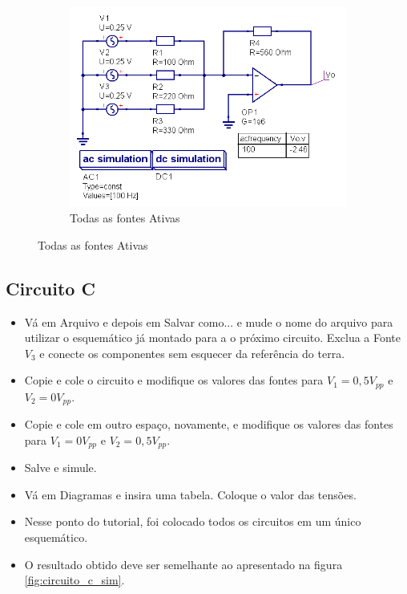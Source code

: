 \begin{figure}[H]
\begin{subfigure}{.45\textwidth}
        \includegraphics[width=\textwidth]{imagens/CircuitoB/-2_46.png}
        \caption{Todas as fontes Ativas}
        \label{fig:0_fon_des}
     \end{subfigure}
\end{figure}



\subsection{Circuito C}


    \begin{itemize}
        \item Vá em Arquivo e depois em Salvar como... e mude o nome do arquivo para utilizar o esquemático já montado para a o próximo circuito. Exclua a Fonte $V_3$ e conecte os componentes sem esquecer da referência do terra.
        \item Copie  e cole o circuito e modifique os valores das fontes para $V_1 = 0,5V_{pp}$ e $V_2=0V_{pp}$.
        \item Copie e cole em outro espaço, novamente, e modifique os valores das fontes para $V_1 = 0V_{pp}$ e $V_2=0,5V_{pp}$.
        \item Salve e simule.
        \item Vá em Diagramas e insira uma tabela. Coloque o valor das tensões.
        \item Nesse ponto do tutorial, foi colocado todos os circuitos em um único esquemático.
        \item O resultado obtido deve ser semelhante ao apresentado na figura \ref{fig:circuito_c_sim}.
    \end{itemize}

